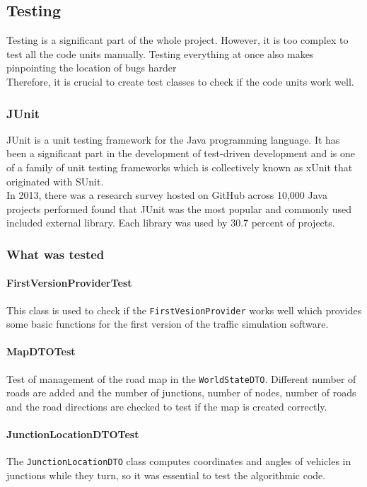 \documentclass[a4paper,12pt]{article}
\begin{document}
\subsection{Testing}
Testing is a significant part of the whole project. However, it is too complex to test all the code units manually. Testing everything at once also makes pinpointing the location of bugs harder\\
Therefore, it is crucial to create test classes to check if the code units work well.\\
\subsubsection{JUnit}
JUnit is a unit testing framework for the Java programming language. It has been a significant part in the development of test-driven development and is one of a family of unit testing frameworks which is collectively known as xUnit that originated with SUnit.\\
In 2013, there was a research survey hosted on GitHub across 10,000 Java projects performed found that JUnit was the most popular and commonly used  included external library. Each library was used by 30.7 percent of projects.\\
\subsubsection{What was tested}
\paragraph*{FirstVersionProviderTest} This class is used to check if the \verb|FirstVesionProvider| works well which provides some basic functions for the first version of the traffic simulation software.
\paragraph*{MapDTOTest} Test of management of the road map in the \verb|WorldStateDTO|. Different number of roads are added and the number of junctions, number of nodes, number of roads and the road directions are checked to test if the map is created correctly.
\paragraph*{JunctionLocationDTOTest} The \verb|JunctionLocationDTO| class computes coordinates and angles of vehicles in junctions while they turn, so it was essential to test the algorithmic code. 
\end{document}
